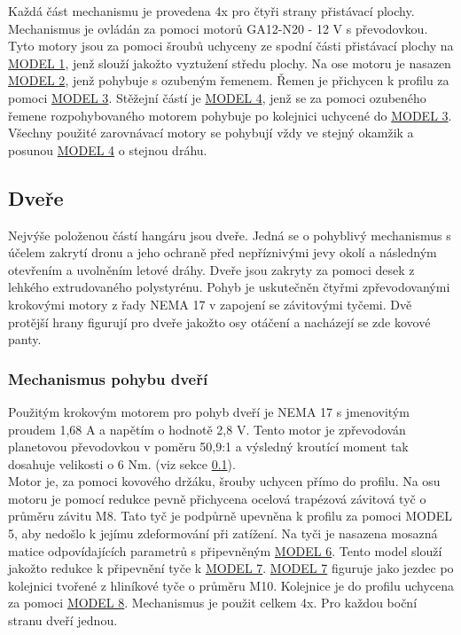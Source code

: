 \documentclass[a4paper]{article}
\begin{document}
    Každá část mechanismu je provedena 4x pro čtyři strany přistávací plochy. Mechanismus je ovládán za pomoci motorů GA12-N20 - 12 V s převodovkou. Tyto motory jsou za pomoci šroubů uchyceny ze spodní části přistávací plochy na \hyperlink{dwg:1}{MODEL 1}, jenž slouží jakožto vyztužení středu plochy. Na ose motoru je nasazen \hyperlink{dwg:2}{MODEL 2}, jenž pohybuje s ozubeným řemenem. Řemen je přichycen k profilu za pomoci \hyperlink{dwg:3}{MODEL 3}. Stěžejní částí je \hyperlink{dwg:4}{MODEL 4}, jenž se za pomoci ozubeného řemene rozpohybovaného motorem pohybuje po kolejnici uchycené do \hyperlink{dwg:3}{MODEL 3}. Všechny použité zarovnávací motory se pohybují vždy ve stejný okamžik a posunou \hyperlink{dwg:4}{MODEL 4} o stejnou dráhu.\\
    
    \subsection{Dveře}\label{34-dveux159e}
    
    Nejvýše položenou částí hangáru jsou dveře. Jedná se o pohyblivý mechanismus s účelem zakrytí dronu a jeho ochraně před nepříznivými jevy okolí a následným otevřením a uvolněním letové dráhy. Dveře jsou zakryty za pomoci desek z lehkého extrudovaného polystyrénu. Pohyb je uskutečněn čtyřmi zpřevodovanými krokovými motory z řady NEMA 17 v zapojení se závitovými tyčemi. Dvě protější hrany figurují pro dveře jakožto osy otáčení a nacházejí se zde kovové panty.\\
    
    \subsubsection{Mechanismus pohybu
    dveří}\label{341-mechanismus-pohybu-dveux159uxed}
    
    Použitým krokovým motorem pro pohyb dveří je NEMA 17 s jmenovitým proudem 1,68 A a napětím o hodnotě 2,8 V. Tento motor je zpřevodován planetovou převodovkou v poměru 50,9:1 a výsledný kroutící moment tak dosahuje velikosti o 6 Nm. (viz sekce \ref{34-dveux159e}).\\

    \noindent    
    Motor je, za pomoci kovového držáku, šrouby uchycen přímo do profilu. Na osu motoru je pomocí redukce pevně přichycena ocelová trapézová závitová tyč o průměru závitu M8. Tato tyč je podpůrně upevněna k profilu za pomoci MODEL 5, aby nedošlo k jejímu zdeformování při zatížení. Na tyči je nasazena mosazná matice odpovídajících parametrů s připevněným \hyperlink{dwg:6}{MODEL 6}. Tento model slouží jakožto redukce k připevnění tyče k \hyperlink{dwg:7}{MODEL 7}. \hyperlink{dwg:7}{MODEL 7} figuruje jako jezdec po kolejnici tvořené z hliníkové tyče o průměru M10. Kolejnice je do profilu uchycena za pomoci \hyperlink{dwg:8}{MODEL 8}. Mechanismus je použit celkem 4x. Pro každou boční stranu dveří jednou.\\
\end{document}
